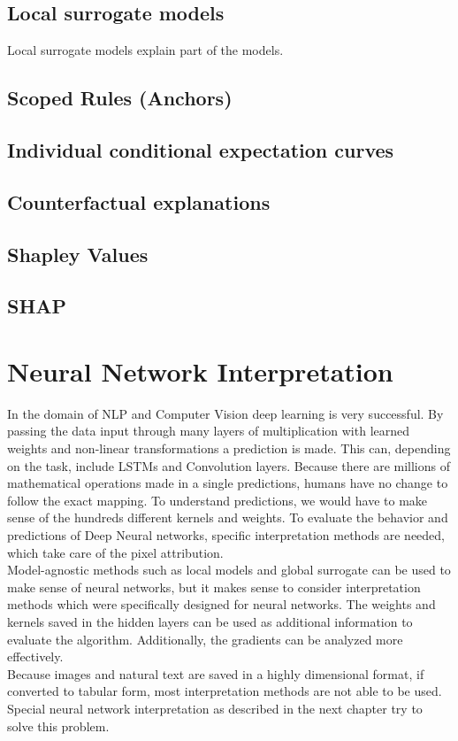 \subsection{Local surrogate models}

Local surrogate models explain part of the models.

\subsection{Scoped Rules (Anchors)}

\subsection{Individual conditional expectation curves}

\subsection{Counterfactual explanations}

\subsection{Shapley Values}

\subsection{SHAP}


\section{Neural Network Interpretation}

In the domain of NLP and Computer Vision deep learning is very successful. By passing the data input through many layers of multiplication with learned weights and non-linear transformations a prediction is made. This can, depending on the task, include LSTMs and Convolution layers. Because there are millions of mathematical operations made in a single predictions, humans have no change to follow the exact mapping. To understand predictions, we would have to make sense of the hundreds different kernels and weights. To evaluate the behavior and predictions of Deep Neural networks, specific interpretation methods are needed, which take care of the pixel attribution.
\\
Model-agnostic methods such as local models and global surrogate can be used to make sense of neural networks, but it makes sense to consider interpretation methods which were specifically designed for neural networks. The weights and kernels saved in the hidden layers can be used as additional information to evaluate the algorithm. Additionally, the gradients can be analyzed more effectively.
\\
Because images and natural text are saved in a highly dimensional format, if converted to tabular form, most interpretation methods are not able to be used. Special neural network interpretation as described in the next chapter try to solve this problem.

